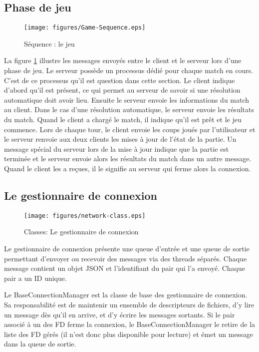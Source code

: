 \subsection{Phase de jeu}
\begin{figure}[h!]
  \centering
  \texttt{[image: figures/Game-Sequence.eps]}
  \caption{\label{fig:Sequence:Game} Séquence : le jeu}
\end{figure}
La figure \ref{fig:Sequence:Game} illustre les messages envoyés entre le \gls{client} et le \gls{serveur} 
lors d'une phase de jeu. 
Le serveur possède un processus dédié pour chaque match en cours. C'est de 
ce processus qu'il est question dans cette section.
Le client indique d'abord qu'il est présent, ce qui permet au serveur de 
savoir si une résolution automatique doit avoir lieu. 
Ensuite le serveur envoie les informations du match au client. Dans le cas 
d'une résolution automatique, le serveur envoie les résultats du match.
Quand le client a chargé le match, il indique qu'il est prêt et le jeu commence.
Lors de chaque tour, le client envoie les coups joués par l'utilisateur et le 
serveur renvoie aux deux clients les mises à jour de l'état de la partie.
Un message spécial du serveur lors de la mise à jour indique que la partie
est terminée et le serveur envoie alors les résultats du match dans un autre 
message. Quand le client les a reçues, il le signifie au serveur qui ferme 
alors la connexion.

\subsection{Le gestionnaire de connexion}
\begin{figure}[h!]
  \centering
  \texttt{[image: figures/network-class.eps]}
  \caption{\label{fig:Class:Network} Classes: Le gestionnaire de connexion}
\end{figure}

Le gestionnaire de connexion présente une queue d'entrée et une queue de sortie permettant d'envoyer ou 
recevoir des messages via des threads séparés. Chaque message contient un objet JSON et l'identifiant du 
pair qui l'a envoyé. Chaque pair a un ID unique.

Le BaseConnectionManager est la classe de base des gestionnaire de connexion. Sa responsabilité est de 
maintenir un ensemble de descripteurs de fichiers, d'y lire un message dès qu'il en arrive, et d'y écrire 
les messages sortants. Si le pair associé à un des FD ferme la connexion, le BaseConnectionManager le 
retire de la liste des FD gérés (il n'est donc plus disponible pour lecture) et émet un message  dans la queue de sortie. 

